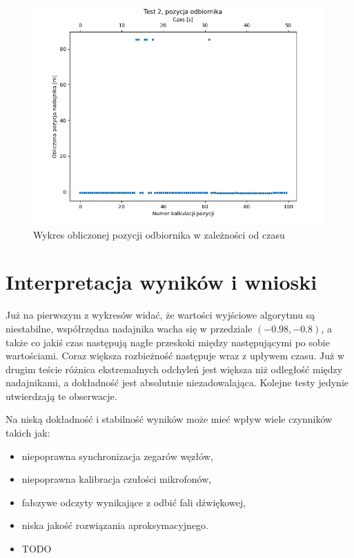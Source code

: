 \begin{figure}[h]
\centering
    \includegraphics[scale=0.6]{pics/position/position_2.png}
\caption{Wykres obliczonej pozycji odbiornika w zależności od czasu}
\label{fig:position_2}
\end{figure}


\section{Interpretacja wyników i wnioski}

Już na pierwszym z wykresów widać, że wartości wyjściowe algorytmu są niestabilne, współrzędna nadajnika wacha się w przedziale $(-0.98, -0.8)$, a także co jakiś czas następują nagłe przeskoki między następującymi po sobie wartościami. Coraz większa rozbieżność następuje wraz z upływem czasu. Już w drugim teście różnica ekstremalnych odchyleń jest większa niż odległość między nadajnikami, a dokładność jest absolutnie niezadowalająca. Kolejne testy jedynie utwierdzają te obserwacje.

Na niską dokładność i stabilność wyników może mieć wpływ wiele czynników takich jak:

\begin{itemize}
    \item niepoprawna synchronizacja zegarów węzłów,
    \item niepoprawna kalibracja czułości mikrofonów,
    \item fałszywe odczyty wynikające z odbić fali dźwiękowej,
    \item niska jakość rozwiązania aproksymacyjnego.
    \item TODO
\end{itemize}

